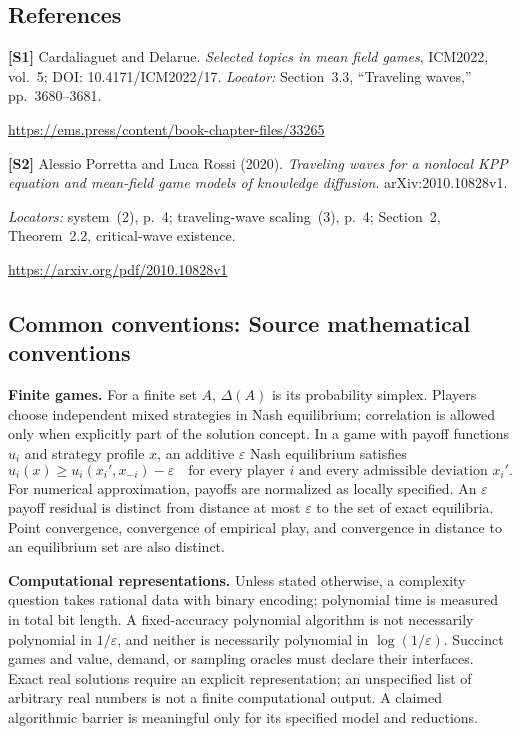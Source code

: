 \documentclass[11pt,a4paper]{article}
\begin{document}
\subsection*{References}
\begingroup\footnotesize\raggedright
{\footnotesize\raggedright
\textbf{[S1]} Cardaliaguet and Delarue. \emph{Selected topics in mean field games}, ICM2022, vol.~5; DOI: 10.4171/ICM2022/17. \textit{Locator:} Section~3.3, ``Traveling waves,'' pp.~3680--3681.\par
\url{https://ems.press/content/book-chapter-files/33265}\par\smallskip
\textbf{[S2]} Alessio Porretta and Luca Rossi (2020). \emph{Traveling waves for a nonlocal KPP equation and mean-field game models of knowledge diffusion}. arXiv:2010.10828v1.\par
\textit{Locators:} system~(2), p.~4; traveling-wave scaling~(3), p.~4; Section~2, Theorem~2.2, critical-wave existence.\par
\url{https://arxiv.org/pdf/2010.10828v1}\par}
\par\endgroup

\subsection*{Common conventions: Source mathematical conventions}

\textbf{Finite games.} For a finite set $A$, $\Delta(A)$ is its probability
simplex. Players choose independent mixed strategies in Nash equilibrium;
correlation is allowed only when explicitly part of the solution concept.
In a game with payoff functions $u_i$ and strategy profile $x$, an additive
$\varepsilon$ Nash equilibrium satisfies
\[
 u_i(x)\geq u_i(x_i',x_{-i})-\varepsilon
 \quad\text{for every player $i$ and every admissible deviation $x_i'$}.
\]
For numerical approximation, payoffs are normalized as locally specified.
An $\varepsilon$ payoff residual is distinct from distance at most
$\varepsilon$ to the set of exact equilibria. Point convergence, convergence
of empirical play, and convergence in distance to an equilibrium set are
also distinct.

\textbf{Computational representations.} Unless stated otherwise, a complexity
question takes rational data with binary encoding; polynomial time is measured
in total bit length. A fixed-accuracy polynomial algorithm is not necessarily
polynomial in $1/\varepsilon$, and neither is necessarily polynomial in
$\log(1/\varepsilon)$. Succinct games and value, demand, or sampling oracles
must declare their interfaces. Exact real solutions require an explicit
representation; an unspecified list of arbitrary real numbers is not a
finite computational output. A claimed algorithmic barrier is meaningful
only for its specified model and reductions.
\end{document}
